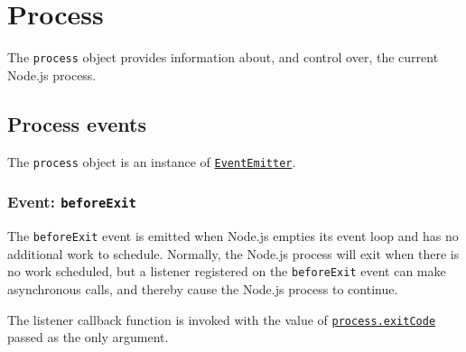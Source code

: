 \section{Process}\label{process}

The \texttt{process} object provides information about, and control
over, the current Node.js process.

\begin{Shaded}
\begin{Highlighting}[]
   \OperatorTok{;}
\end{Highlighting}
\end{Shaded}

\begin{Shaded}
\begin{Highlighting}[]
  \OperatorTok{=} \NormalTok{(}\NormalTok{)}\OperatorTok{;}
\end{Highlighting}
\end{Shaded}

\subsection{Process events}\label{process-events}

The \texttt{process} object is an instance of
\href{events.md\#class-eventemitter}{\texttt{EventEmitter}}.

\subsubsection{\texorpdfstring{Event:
\texttt{\textquotesingle{}beforeExit\textquotesingle{}}}{Event: \textquotesingle beforeExit\textquotesingle{}}}\label{event-beforeexit}

The \texttt{\textquotesingle{}beforeExit\textquotesingle{}} event is
emitted when Node.js empties its event loop and has no additional work
to schedule. Normally, the Node.js process will exit when there is no
work scheduled, but a listener registered on the
\texttt{\textquotesingle{}beforeExit\textquotesingle{}} event can make
asynchronous calls, and thereby cause the Node.js process to continue.

The listener callback function is invoked with the value of
\hyperref[processexitcode_1]{\texttt{process.exitCode}} passed as the
only argument.

